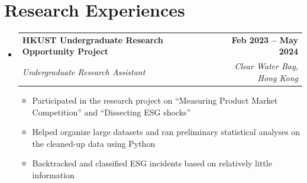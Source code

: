 \documentclass[letterpaper,11pt]{article}
\newcommand{\resumeItem}[1]{
  \item\small{
    {#1 \vspace{-2pt}}
  }
}
\newcommand{\resumeSubheading}[4]{
  \vspace{-2pt}\item
    \begin{tabularx}{\textwidth}[t]{>{\raggedright\arraybackslash}X r} %
      \textbf{#1} & \textbf{\small #2} \\
      \textit{\small#3} & \textit{\small #4} \\
    \end{tabularx}\vspace{-7pt} %
}
\newcommand{\resumeSubHeadingListStart}{\begin{itemize}[leftmargin=0.0in, label={}]}
\newcommand{\resumeSubHeadingListEnd}{\end{itemize}}
\newcommand{\resumeItemListStart}{\begin{itemize}}
\newcommand{\resumeItemListEnd}{\end{itemize}\vspace{-5pt}}
\begin{document}
\section{Research Experiences}
    \resumeSubHeadingListStart
        \resumeSubheading
            {HKUST Undergraduate Research Opportunity Project}{Feb 2023 -- May 2024}
            {Undergraduate Research Assistant}{Clear Water Bay, Hong Kong}
            \resumeItemListStart
                \resumeItem{Participated in the research project on ``Measuring Product Market Competition'' and ``Dissecting ESG shocks''}
                \resumeItem{Helped organize large datasets and ran preliminary statistical analyses on the cleaned-up data using Python}\
                \resumeItem{Backtracked and classified ESG incidents based on relatively little information}
            \resumeItemListEnd
    \resumeSubHeadingListEnd
\vspace{-16pt}
\end{document}
